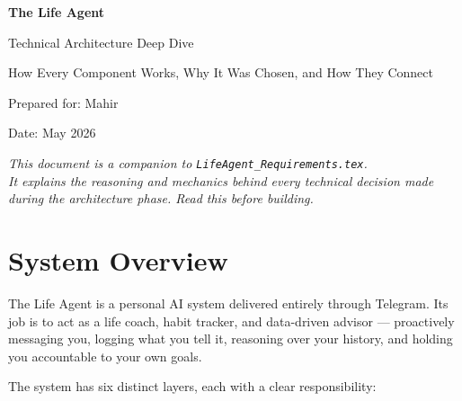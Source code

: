 \documentclass[12pt, a4paper]{article}
\begin{document}
\begin{titlepage}
    \centering
    \vspace*{3cm}
    {\Huge\bfseries The Life Agent\par}
    \vspace{0.5cm}
    {\large\textcolor{midgray}{Technical Architecture Deep Dive}\par}
    \vspace{1.5cm}
    {\normalsize How Every Component Works, Why It Was Chosen, and How They Connect\par}
    \vspace{0.5cm}
    {\small\textcolor{midgray}{Prepared for: Mahir\par}}
    \vspace{0.3cm}
    {\small\textcolor{midgray}{Date: May 2026\par}}
    \vfill
    \begin{mdframed}[backgroundcolor=lightgray, linecolor=lightgray]
    \centering
    \small\textit{This document is a companion to \texttt{LifeAgent\_Requirements.tex}.\\
    It explains the reasoning and mechanics behind every technical decision made\\
    during the architecture phase. Read this before building.}
    \end{mdframed}
\end{titlepage}

\tableofcontents
\newpage

\section{System Overview}

The Life Agent is a personal AI system delivered entirely through Telegram. Its job is to act as a life coach, habit tracker, and data-driven advisor --- proactively messaging you, logging what you tell it, reasoning over your history, and holding you accountable to your own goals.

The system has six distinct layers, each with a clear responsibility:
\end{document}
